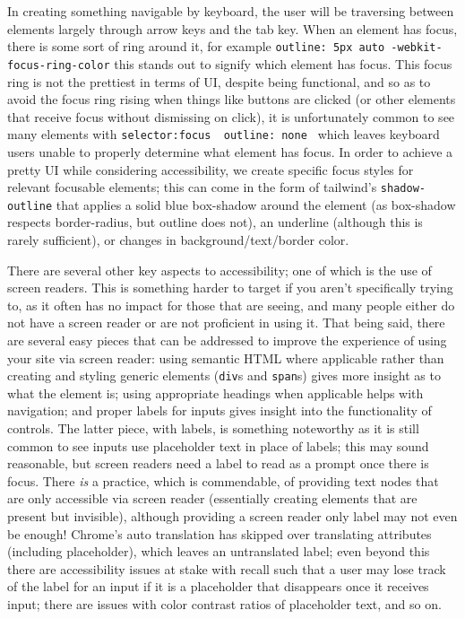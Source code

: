 \documentclass[11pt, twoside, reqno]{book}
\begin{document}
In creating something navigable by keyboard, the user will be traversing between elements largely through arrow keys and the tab key. When an element has focus, there is some sort of ring around it, for example \texttt{outline: 5px auto -webkit-focus-ring-color} this stands out to signify which element has focus. This focus ring is not the prettiest in terms of UI, despite being functional, and so as to avoid the focus ring rising when things like buttons are clicked (or other elements that receive focus without dismissing on click), it is unfortunately common to see many elements with \texttt{selector:focus { outline: none }} which leaves keyboard users unable to properly determine what element has focus. In order to achieve a pretty UI while considering accessibility, we create specific focus styles for relevant focusable elements; this can come in the form of tailwind's \texttt{shadow-outline} that applies a solid blue box-shadow around the element (as box-shadow respects border-radius, but outline does not), an underline (although this is rarely sufficient), or changes in background/text/border color.

There are several other key aspects to accessibility; one of which is the use of screen readers. This is something harder to target if you aren't specifically trying to, as it often has no impact for those that are seeing, and many people either do not have a screen reader or are not proficient in using it. That being said, there are several easy pieces that can be addressed to improve the experience of using your site via screen reader: using semantic HTML where applicable rather than creating and styling generic elements (\texttt{div}s and \texttt{span}s) gives more insight as to what the element is; using appropriate headings when applicable helps with navigation; and proper labels for inputs gives insight into the functionality of controls. The latter piece, with labels, is something noteworthy as it is still common to see inputs use placeholder text in place of labels; this may sound reasonable, but screen readers need a label to read as a prompt once there is focus. There \textit{is} a practice, which is commendable, of providing text nodes that are only accessible via screen reader (essentially creating elements that are present but invisible), although providing a screen reader only label may not even be enough! Chrome's auto translation has skipped over translating attributes (including placeholder), which leaves an untranslated label; even beyond this there are accessibility issues at stake with recall such that a user may lose track of the label for an input if it is a placeholder that disappears once it receives input; there are issues with color contrast ratios of placeholder text, and so on.
\end{document}
